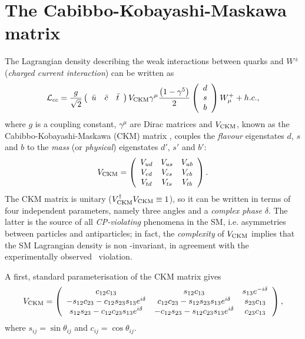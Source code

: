 \section{The Cabibbo-Kobayashi-Maskawa matrix}
\label{sec:ckm}

The Lagrangian density describing the weak interactions between quarks and $W^\pm$ (\emph{charged current interaction}) can be written as
\begin{equation}
	\label{eq:Lcc}
	\mathcal L_{cc} = \frac{g}{\sqrt{2}} \left( \begin{array}{ccc} \bar u & \bar c & \bar t \end{array} \right) V_{\rm CKM} \gamma^\mu \frac{\left(1-\gamma^5\right)}{2} \left( \begin{array}{c} d \\ s \\ b \end{array} \right) W^+_{\mu} + h.c.,
\end{equation}
where $g$ is a coupling constant, $\gamma^\mu$ are Dirac matrices and $V_{\rm CKM}$, known as the Cabibbo-Kobayashi-Maskawa (CKM) matrix \cite{PRL-10-1963-531,PTP-49-1973-652}, 
couples the \emph{flavour} eigenstates $d$, $s$ and $b$ to the \emph{mass} (or \emph{physical}) eigenstates $d'$, $s'$ and $b'$:
\begin{equation}
	V_{\rm CKM} = \left( \begin{array}{ccc} V_{ud} & V_{us} & V_{ub} \\ V_{cd} & V_{cs} & V_{cb} \\ V_{td} & V_{ts} & V_{tb} \end{array} \right).  
\end{equation}
The CKM matrix is unitary ($V_{\rm CKM}^\dagger V_{\rm CKM}\equiv 1$), so it can be written in terms of four independent parameters, namely three angles and a \emph{complex phase} $\delta$. 
The latter is the source of all \emph{CP-violating} phenomena in the SM, i.e. asymmetries between particles and antiparticles; in fact, the \emph{complexity} of $V_{\rm CKM}$
implies that the SM Lagrangian density is non \CP-invariant, in agreement with the experimentally observed \CP~violation.

A first, standard parameterisation of the CKM matrix \cite{PRL-53-1984-53} gives
\begin{equation}
	V_{\rm CKM} = \left( \begin{array}{ccc} c_{12}c_{13} & s_{12}c_{13} & s_{13}e^{-i\delta} \\ 
								-s_{12}c_{23}-c_{12}s_{23}s_{13}e^{i\delta} &  c_{12}c_{23}-s_{12}s_{23}s_{13}e^{i\delta} & s_{23}c_{13} \\
								s_{12}s_{23}-c_{12}c_{23}s_{13}e^{i\delta} &  -c_{12}s_{23}-s_{12}c_{23}s_{13}e^{i\delta} & c_{23}c_{13} \end{array} \right),
\end{equation}
where $s_{ij}=\sin\theta_{ij}$ and $c_{ij}=\cos\theta_{ij}$.

